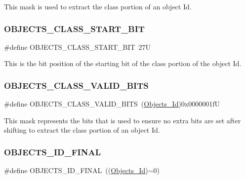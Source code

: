 This mask is used to extract the class portion of an object Id. \mbox{\label{group__RTEMSScoreObject_gaa72bdfbb27b9279dbac4fe680e9d6f98}} 
\subsubsection{\texorpdfstring{OBJECTS\_CLASS\_START\_BIT}{OBJECTS\_CLASS\_START\_BIT}}
{\footnotesize\ttfamily \#define O\+B\+J\+E\+C\+T\+S\+\_\+\+C\+L\+A\+S\+S\+\_\+\+S\+T\+A\+R\+T\+\_\+\+B\+IT~27U}

This is the bit position of the starting bit of the class portion of the object Id. \mbox{\label{group__RTEMSScoreObject_ga694f359ec2d200239db58e29f17afdf5}} 
\subsubsection{\texorpdfstring{OBJECTS\_CLASS\_VALID\_BITS}{OBJECTS\_CLASS\_VALID\_BITS}}
{\footnotesize\ttfamily \#define O\+B\+J\+E\+C\+T\+S\+\_\+\+C\+L\+A\+S\+S\+\_\+\+V\+A\+L\+I\+D\+\_\+\+B\+I\+TS~(\mbox{\hyperlink{group__RTEMSScoreObject_ga5821f52a51072941bdd603e542d0863e}{Objects\+\_\+\+Id}})0x0000001fU}

This mask represents the bits that is used to ensure no extra bits are set after shifting to extract the class portion of an object Id. \mbox{\label{group__RTEMSScoreObject_ga02561e994044206ad10e7fbfe6a0b0ba}} 
\subsubsection{\texorpdfstring{OBJECTS\_ID\_FINAL}{OBJECTS\_ID\_FINAL}}
{\footnotesize\ttfamily \#define O\+B\+J\+E\+C\+T\+S\+\_\+\+I\+D\+\_\+\+F\+I\+N\+AL~((\mbox{\hyperlink{group__RTEMSScoreObject_ga5821f52a51072941bdd603e542d0863e}{Objects\+\_\+\+Id}})$\sim$0)}

